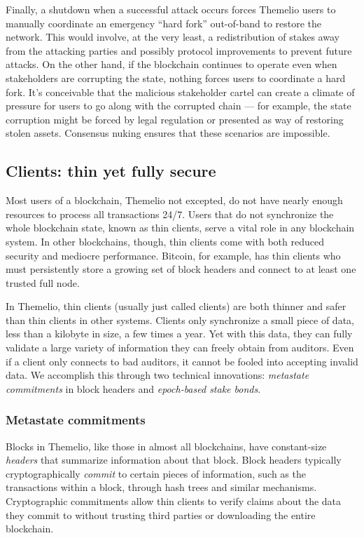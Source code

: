 \documentclass[headinclude,12pt]{scrbook}
\begin{document}
Finally, a shutdown when a successful attack occurs forces Themelio users to manually coordinate an emergency ``hard fork'' out-of-band to restore the network. This would involve, at the very least, a redistribution of stakes away from the attacking parties and possibly protocol improvements to prevent future attacks. On the other hand, if the blockchain continues to operate even when stakeholders are corrupting the state, nothing forces users to coordinate a hard fork. It's conceivable that the malicious stakeholder cartel can create a climate of pressure for users to go along with the corrupted chain --- for example, the state corruption might be forced by legal regulation or presented as way of restoring stolen assets. Consensus nuking ensures that these scenarios are impossible.

\subsection{Clients: thin yet fully secure}

Most users of a blockchain, Themelio not excepted, do not have nearly enough resources to process all transactions 24/7. Users that do not synchronize the whole blockchain state, known as thin clients, serve a vital role in any blockchain system. In other blockchains, though, thin clients come with both reduced security and mediocre performance. Bitcoin, for example, has thin clients who must persistently store a growing set of block headers and connect to at least one trusted full node.

In Themelio, thin clients (usually just called clients) are both thinner and safer than thin clients in other systems. Clients only synchronize a small piece of data, less than a kilobyte in size, a few times a year. Yet with this data, they can fully validate a large variety of information they can freely obtain from auditors. Even if a client only connects to bad auditors, it cannot be fooled into accepting invalid data. We accomplish this through two technical innovations: \textit{metastate commitments} in block headers and \textit{epoch-based stake bonds}.

\subsubsection{Metastate commitments}

Blocks in Themelio, like those in almost all blockchains, have constant-size \textit{headers} that summarize information about that block. Block headers typically cryptographically \textit{commit} to certain pieces of information, such as the transactions within a block, through hash trees and similar mechanisms. Cryptographic commitments allow thin clients to verify claims about the data they commit to without trusting third parties or downloading the entire blockchain.
\end{document}

